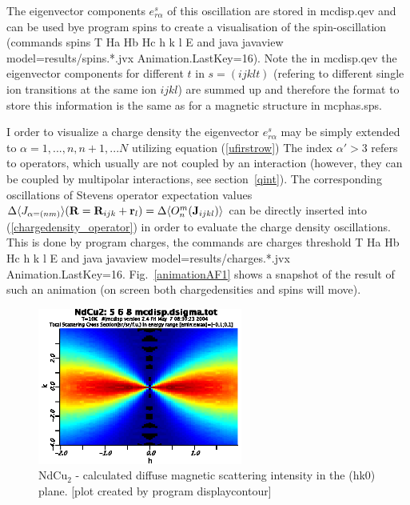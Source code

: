 The eigenvector components $e^s_{r\alpha}$ 
 of this oscillation are stored 
 in {\prg mcdisp.qev} and can be used bye program {\prg spins} to create
 a visualisation of the spin-oscillation (commands {\prg spins T Ha Hb Hc h k l E} and {\prg java javaview %
model=results/spins.*.jvx Animation.LastKey=16}). Note the in {\prg mcdisp.qev} the eigenvector components
for different $t$ in $s=(ijklt)$ (refering to different single ion transitions at the same ion $ijkl$) are summed up and 
therefore the format to store this information is the same as for a magnetic structure in {\prg mcphas.sps}.

I order to visualize a charge density the eigenvector $e^s_{r\alpha}$
 may be simply extended to $\alpha= 1,...,n,n+1,...N$ utilizing equation (\ref{ufirstrow})
  The index $\alpha' > 3$ refers
 to operators, which usually are not coupled by an interaction (however, they can be coupled
 by multipolar interactions, see section~\ref{qint}). The corresponding 
 oscillations of Stevens operator expectation values $\Delta \langle J_{\alpha = (nm)}\rangle(\mbf R=\mbf R_{ijk}+\mbf %
r_l) =\Delta \langle O_n^m(\mbf J_{ijkl})\rangle$ can be directly inserted into
(\ref{chargedensity_operator}) in order to evaluate the charge density oscillations. This is done by program
{\prg charges}, the commands are {\prg charges threshold T Ha Hb Hc h k l E} and {\prg java javaview %
model=results/charges.*.jvx Animation.LastKey=16}. Fig.~\ref{animationAF1} shows a snapshot of the result of such an %
animation (on screen both chargedensities and spins will move).





\begin{figure}[t]%
\begin{center}\leavevmode
\includegraphics[angle=-0, width=0.6\textwidth]{figsrc/diffuse_ndcu2_10K.eps}
\end{center}
\caption{\label{diffus}
NdCu$_2$ - calculated diffuse magnetic scattering intensity in the (hk0) plane.
[plot created by program {\prg displaycontour}]
}
\end{figure}

